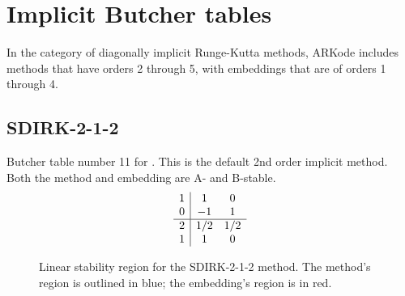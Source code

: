 \documentclass[letterpaper,10pt,english]{sphinxmanual}
\begin{document}
\section{Implicit Butcher tables}
\label{Butcher:implicit-butcher-tables}\label{Butcher:butcher-implicit}
In the category of diagonally implicit Runge-Kutta methods, ARKode
includes methods that have orders 2 through 5, with embeddings that are of
orders 1 through 4.


\subsection{SDIRK-2-1-2}
\label{Butcher:sdirk-2-1-2}\label{Butcher:butcher-sdirk-2-1}
Butcher table number 11
for {\hyperref[c_interface/User_callable:ARKodeSetIRKTableNum]{}}.  This is
the default 2nd order implicit method.  Both the method and embedding
are A- and B-stable.
\begin{gather}
\begin{split}\begin{array}{r|cc}
  1 & 1 & 0 \\
  0 & -1 & 1 \\
  \hline
  2 & 1/2 & 1/2 \\
  1 & 1 & 0
\end{array}\end{split}\notag
\end{gather}\begin{figure}[htbp]
\centering
\capstart

\caption{Linear stability region for the SDIRK-2-1-2 method.  The method's
region is outlined in blue; the embedding's region is in red.}\end{figure}
\end{document}
